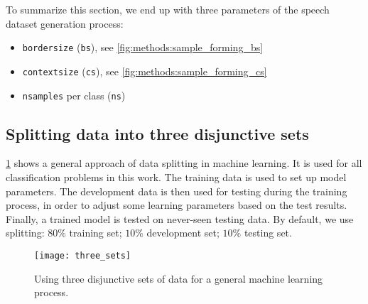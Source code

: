 To summarize this section, we end up with three parameters of the speech dataset generation process:

\begin{itemize}
\item \texttt{border\textunderscore size} (\texttt{bs}), see \cref{fig:methods:sample_forming_bs}
\item \texttt{context\textunderscore size} (\texttt{cs}), see \cref{fig:methods:sample_forming_cs}
\item \texttt{n\textunderscore samples} per class (\texttt{ns})
\end{itemize}

\subsection*{Splitting data into three disjunctive sets}
\cref{fig:methods:three_sets} shows a general approach of data splitting in machine learning. It is used for all classification problems in this work. The training data is used to set up model parameters. The development data is then used for testing during the training process, in order to adjust some learning parameters based on the test results. Finally, a trained model is tested on never-seen testing data. By default, we use splitting: $ 80\% $ training set; $ 10\% $ development set; $ 10\% $ testing set.

\begin{figure}[H]
\centering
\texttt{[image: three\_sets]}
\caption{Using three disjunctive sets of data for a general machine learning process.}
\label{fig:methods:three_sets}
\end{figure}